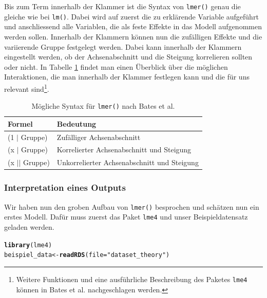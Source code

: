 \documentclass[12pt]{article}\usepackage[]{graphicx}\usepackage[]{color}
\makeatletter
\newcommand{\hlstr}[1]{\textcolor[rgb]{0.192,0.494,0.8}{#1}}%
\newcommand{\hlstd}[1]{\textcolor[rgb]{0.345,0.345,0.345}{#1}}%
\newcommand{\hlkwb}[1]{\textcolor[rgb]{0.69,0.353,0.396}{#1}}%
\newcommand{\hlkwc}[1]{\textcolor[rgb]{0.333,0.667,0.333}{#1}}%
\newcommand{\hlkwd}[1]{\textcolor[rgb]{0.737,0.353,0.396}{\textbf{#1}}}%
\newenvironment{kframe}{%
 \def\at@end@of@kframe{}%
 \ifinner\ifhmode%
  \def\at@end@of@kframe{\end{minipage}}%
  \begin{minipage}{\columnwidth}%
 \fi\fi%
 \def\FrameCommand##1{\hskip\@totalleftmargin \hskip-\fboxsep
 \colorbox{shadecolor}{##1}\hskip-\fboxsep
     \hskip-\linewidth \hskip-\@totalleftmargin \hskip\columnwidth}%
 \MakeFramed {\advance\hsize-\width
   \@totalleftmargin\z@ \linewidth\hsize
   \@setminipage}}%
 {\par\unskip\endMakeFramed%
 \at@end@of@kframe}
\newenvironment{knitrout}{}{} %
\makeatother
\begin{document}
Bis zum Term innerhalb der Klammer ist die Syntax von \texttt{lmer()} genau die gleiche wie bei \texttt{lm()}. Dabei wird auf zuerst die zu erklärende Variable aufgeführt und anschliessend alle Variablen, die als feste Effekte in das Modell aufgenommen werden sollen. Innerhalb der Klammern können nun die zufälligen Effekte und die variierende Gruppe festgelegt werden. Dabei kann innerhalb der Klammern eingestellt werden, ob der Achsenabschnitt und die Steigung korrelieren sollten oder nicht. In Tabelle \ref{tab:lmersyntax} findet man einen Überblick über die möglichen Interaktionen, die man innerhalb der Klammer festlegen kann und die für uns relevant sind\footnote{Weitere Funktionen und eine ausführliche Beschreibung des Paketes \texttt{lme4} können in Bates et al. \citeyearpar{batesetal2015lme4} nachgeschlagen werden.}.
\begin{table}[ht] 
\centering
\begin{threeparttable}
\caption{Mögliche Syntax für \texttt{lmer()} nach Bates et al. \citeyearpar{batesetal2015lme4}}
\begin{tabular}{ll}
 	\toprule
	Formel & Bedeutung\\ 
  	\midrule
	(1 $|$ Gruppe)	& Zufälliger Achsenabschnitt \\
	(x $|$ Gruppe) & Korrelierter Achsenabschnitt und Steigung \\
	(x $||$ Gruppe) & Unkorrelierter Achsenabschnitt und Steigung\\
  	\bottomrule
\end{tabular}
\label{tab:lmersyntax}
\end{threeparttable}
\end{table}

\subsubsection{Interpretation eines Outputs} \label{section:interpretation_output}
Wir haben nun den groben Aufbau von \texttt{lmer()} besprochen und schätzen nun ein erstes Modell. Dafür muss zuerst das Paket \texttt{lme4} und unser Beispieldatensatz geladen werden.

\singlespacing
\begin{knitrout}
\color{fgcolor}\begin{kframe}
\begin{alltt}
\hlkwd{library}\hlstd{(lme4)}
\hlstd{beispiel_data} \hlkwb{<-} \hlkwd{readRDS}\hlstd{(}\hlkwc{file} \hlstd{=} \hlstr{"dataset_theory"}\hlstd{)}
\end{alltt}
\end{kframe}
\end{knitrout}
\end{document}
